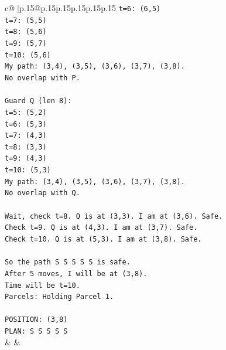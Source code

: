 \documentclass{article}
\begin{document}
{\begin{supertabular}{c@{$\;$}|p{.15\linewidth}@{}p{.15\linewidth}p{.15\linewidth}p{.15\linewidth}p{.15\linewidth}p{.15\linewidth}}
{{{\texttt{t=6: (6,5)} \\
\texttt{t=7: (5,5)} \\
\texttt{t=8: (5,6)} \\
\texttt{t=9: (5,7)} \\
\texttt{t=10: (5,6)} \\
\texttt{My path: (3,4), (3,5), (3,6), (3,7), (3,8).} \\
\texttt{No overlap with P.} \\
\\ 
\texttt{Guard Q (len 8):} \\
\texttt{t=5: (5,2)} \\
\texttt{t=6: (5,3)} \\
\texttt{t=7: (4,3)} \\
\texttt{t=8: (3,3)} \\
\texttt{t=9: (4,3)} \\
\texttt{t=10: (5,3)} \\
\texttt{My path: (3,4), (3,5), (3,6), (3,7), (3,8).} \\
\texttt{No overlap with Q.} \\
\\ 
\texttt{Wait, check t=8. Q is at (3,3). I am at (3,6). Safe.} \\
\texttt{Check t=9. Q is at (4,3). I am at (3,7). Safe.} \\
\texttt{Check t=10. Q is at (5,3). I am at (3,8). Safe.} \\
\\ 
\texttt{So the path S S S S S is safe.} \\
\texttt{After 5 moves, I will be at (3,8).} \\
\texttt{Time will be t=10.} \\
\texttt{Parcels: Holding Parcel 1.} \\
\\ 
\texttt{POSITION: (3,8)} \\
\texttt{PLAN: S S S S S} \\
            }
        }
    }
    & & \\ \\


\end{supertabular}}
\end{document}
